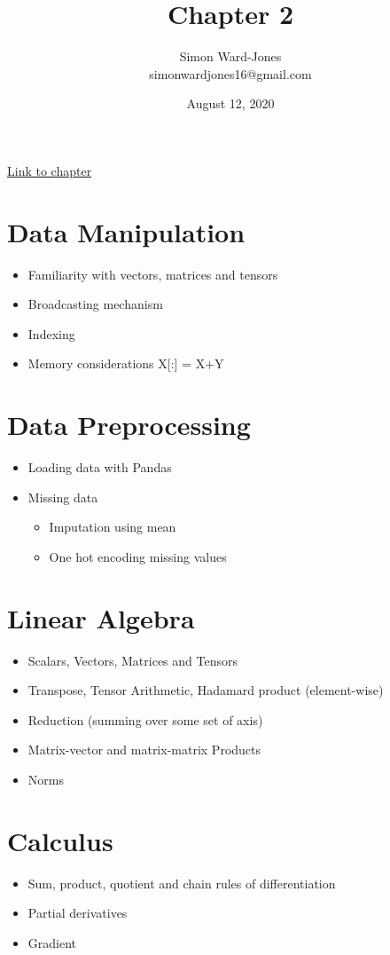 \documentclass[12pt,notitlepage]{article}
\begin{document}


\title{\Large{\textbf{Chapter 2}}}
\date{August 12, 2020}
\author{Simon Ward-Jones\\simonwardjones16@gmail.com}

\maketitle
\href{https://d2l.ai/chapter_preliminaries/index.html}{Link to chapter}

\section{Data Manipulation}
\begin{itemize}
    \item Familiarity with vectors, matrices and tensors
    \item Broadcasting mechanism
    \item Indexing
    \item Memory considerations X[:] = X+Y 
\end{itemize}

\section{Data Preprocessing}
\begin{itemize}
    \item Loading data with Pandas
    \item Missing data
    \begin{itemize}
        \item Imputation using mean
        \item One hot encoding missing values
    \end{itemize}
\end{itemize}

\section{Linear Algebra}
\begin{itemize}
    \item Scalars, Vectors, Matrices and Tensors
    \item Transpose, Tensor Arithmetic, Hadamard product (element-wise)
    \item Reduction (summing over some set of axis)
    \item Matrix-vector and matrix-matrix Products
    \item Norms
\end{itemize}

\section{Calculus}
\begin{itemize}
    \item Sum, product, quotient and chain rules of differentiation
    \item Partial derivatives
    \item Gradient
\end{itemize}

\vfill

\nocite{zhang2020dive}
\end{document}
